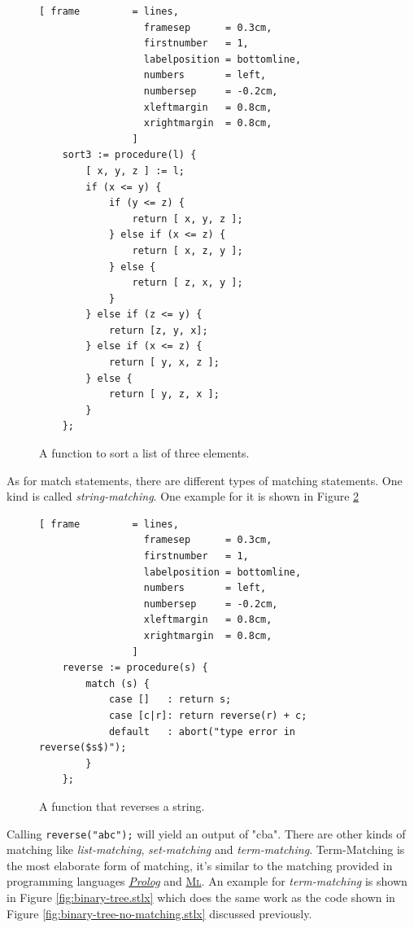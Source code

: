 \documentclass[11pt]{report}
\begin{document}
\begin{figure}[!ht]
\centering
\begin{Verbatim}[ frame         = lines, 
                  framesep      = 0.3cm, 
                  firstnumber   = 1,
                  labelposition = bottomline,
                  numbers       = left,
                  numbersep     = -0.2cm,
                  xleftmargin   = 0.8cm,
                  xrightmargin  = 0.8cm,
                ]
    sort3 := procedure(l) {
        [ x, y, z ] := l;
        if (x <= y) {
            if (y <= z) {
                return [ x, y, z ];
            } else if (x <= z) { 
                return [ x, z, y ];
            } else {
                return [ z, x, y ];
            }
        } else if (z <= y) { 
            return [z, y, x];
        } else if (x <= z) { 
            return [ y, x, z ];
        } else {
            return [ y, z, x ];
        }
    };
\end{Verbatim}
\vspace*{-0.3cm}
\caption{A function to sort a list of three elements.}
\label{fig:sort3.stlx}
\end{figure}

As for match statements, there are different types of matching statements. One kind is called \textsl{string-matching}. One example for it is shown in Figure \ref{fig:reverse.stlx}

\begin{figure}[!ht]
\centering
\begin{Verbatim}[ frame         = lines, 
                  framesep      = 0.3cm, 
                  firstnumber   = 1,
                  labelposition = bottomline,
                  numbers       = left,
                  numbersep     = -0.2cm,
                  xleftmargin   = 0.8cm,
                  xrightmargin  = 0.8cm,
                ]
    reverse := procedure(s) {
        match (s) {
            case []   : return s;
            case [c|r]: return reverse(r) + c;
            default   : abort("type error in reverse($s$)");
        }
    };
\end{Verbatim}
\vspace*{-0.3cm}
\caption{A function that reverses a string.}
\label{fig:reverse.stlx}
\end{figure}
Calling \texttt{reverse("abc");} will yield an output of "cba". There are other kinds of matching like \textsl{list-matching}, \textsl{set-matching} and \textsl{term-matching}. Term-Matching is the most elaborate form of matching, it's similar to the matching provided in programming languages \href{http://en.wikipedia.org/wiki/Prolog}{\textsl{Prolog}} and 
\href{http://en.wikipedia.org/wiki/ML_(programming_language)}{\textsc{Ml}}. An example for \textsl{term-matching} is shown in Figure \ref{fig:binary-tree.stlx} which does the same work as the code shown in Figure \ref{fig:binary-tree-no-matching.stlx} discussed previously.
\end{document}
